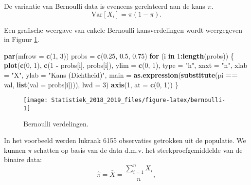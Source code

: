 \documentclass[12pt,dutch,coursenotes]{book}
\newenvironment{Shaded}{\begin{snugshade}}{\end{snugshade}}
\newcommand{\KeywordTok}[1]{\textcolor[rgb]{0.13,0.29,0.53}{\textbf{#1}}}
\newcommand{\DataTypeTok}[1]{\textcolor[rgb]{0.13,0.29,0.53}{#1}}
\newcommand{\DecValTok}[1]{\textcolor[rgb]{0.00,0.00,0.81}{#1}}
\newcommand{\FloatTok}[1]{\textcolor[rgb]{0.00,0.00,0.81}{#1}}
\newcommand{\StringTok}[1]{\textcolor[rgb]{0.31,0.60,0.02}{#1}}
\newcommand{\ControlFlowTok}[1]{\textcolor[rgb]{0.13,0.29,0.53}{\textbf{#1}}}
\newcommand{\OperatorTok}[1]{\textcolor[rgb]{0.81,0.36,0.00}{\textbf{#1}}}
\newcommand{\NormalTok}[1]{#1}
\theoremstyle{definition}
\theoremstyle{definition}
\theoremstyle{definition}
\theoremstyle{remark}
\begin{document}
De variantie van Bernoulli data is eveneens gerelateerd aan de kans
\(\pi\). \[\text{Var}[X_i]=\pi (1-\pi).\]

Een grafische weergave van enkele Bernoulli kansverdelingen wordt
weergegeven in Figuur \ref{fig:bernoulli}.

\begin{Shaded}
\begin{Highlighting}[]
\KeywordTok{par}\NormalTok{(}\DataTypeTok{mfrow =} \KeywordTok{c}\NormalTok{(}\DecValTok{1}\NormalTok{, }\DecValTok{3}\NormalTok{))}
\NormalTok{probs =}\StringTok{ }\KeywordTok{c}\NormalTok{(}\FloatTok{0.25}\NormalTok{, }\FloatTok{0.5}\NormalTok{, }\FloatTok{0.75}\NormalTok{)}
\ControlFlowTok{for}\NormalTok{ (i }\ControlFlowTok{in} \DecValTok{1}\OperatorTok{:}\KeywordTok{length}\NormalTok{(probs)) \{}
    \KeywordTok{plot}\NormalTok{(}\KeywordTok{c}\NormalTok{(}\DecValTok{0}\NormalTok{, }\DecValTok{1}\NormalTok{), }\KeywordTok{c}\NormalTok{(}\DecValTok{1} \OperatorTok{-}\StringTok{ }\NormalTok{probs[i], probs[i]), }\DataTypeTok{ylim =} \KeywordTok{c}\NormalTok{(}\DecValTok{0}\NormalTok{, }
        \DecValTok{1}\NormalTok{), }\DataTypeTok{type =} \StringTok{"h"}\NormalTok{, }\DataTypeTok{xaxt =} \StringTok{"n"}\NormalTok{, }\DataTypeTok{xlab =} \StringTok{"X"}\NormalTok{, }\DataTypeTok{ylab =} \StringTok{"Kans (Dichtheid)"}\NormalTok{, }
        \DataTypeTok{main =} \KeywordTok{as.expression}\NormalTok{(}\KeywordTok{substitute}\NormalTok{(pi }\OperatorTok{==}\StringTok{ }\NormalTok{val, }
            \KeywordTok{list}\NormalTok{(}\DataTypeTok{val =}\NormalTok{ probs[i]))), }\DataTypeTok{lwd =} \DecValTok{3}\NormalTok{)}
    \KeywordTok{axis}\NormalTok{(}\DecValTok{1}\NormalTok{, }\DataTypeTok{at =} \KeywordTok{c}\NormalTok{(}\DecValTok{0}\NormalTok{, }\DecValTok{1}\NormalTok{))}
\NormalTok{\}}
\end{Highlighting}
\end{Shaded}

\begin{figure}

{\centering \texttt{[image: Statistiek\_2018\_2019\_files/figure-latex/bernoulli-1]} 

}

\caption{Bernoulli verdelingen.}\label{fig:bernoulli}
\end{figure}

In het voorbeeld werden lukraak 6155 observaties getrokken uit de
populatie. We kunnen \(\pi\) schatten op basis van de data d.m.v. het
steekproefgemiddelde van de binaire data:
\[\hat \pi = \bar X = \frac{\sum\limits_{i=1}^n X_i}{n},\]
\end{document}
